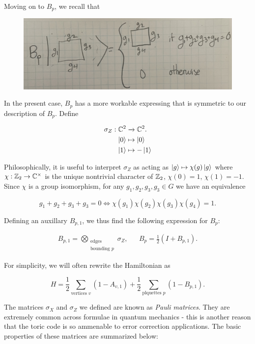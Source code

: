 \documentclass{article}
\theoremstyle{definition}
\numberwithin{figure}{section}
\begin{document}
Moving on to $B_p$, we recall that

\begin{figure}[h]
\begin{center}
\includegraphics[scale=.04]{Bp-definition}
\end{center}
\end{figure}

In the present case, $B_p$ has a more workable expressing that is symmetric to our description of $B_p$. Define

\begin{align*}
\sigma_Z:\mathbb{C}^2&\xrightarrow{}\mathbb{C}^2.\\
\ket{0}&\mapsto \ket{0}\\
\ket{1}&\mapsto -\ket{1}
\end{align*}

Philosophically, it is useful to interpret $\sigma_Z$ as acting as $\ket{g}\mapsto \chi(g)\ket{g}$ where $\chi:\mathbb{Z}_2\to\mathbb{C}^\times$ is the unique nontrivial character of $\mathbb{Z}_2$, $\chi(0)=1$, $\chi(1)=-1$. Since $\chi$ is a group isomorphism, for any $g_1,g_2,g_3,g_3\in G$ we have an equivalence

$$g_1+g_2+g_3+g_3=0 \iff \chi(g_1)\chi(g_2)\chi(g_3)\chi(g_4)=1.$$

Defining an auxillary $B_{p,1}$, we thus find the following expression for $B_p$:

\begin{align*}
B_{p,1}=\bigotimes_{\substack{\text{edges} \\ \text{bounding }p}}\sigma_Z, && B_p=\frac{1}{2}\left(I + B_{p,1}\right).
\end{align*}

For simplicity, we will often rewrite the Hamiltonian as

$$H=\frac{1}{2}\sum_{\text{vertices }v}(1-A_{v,1})+\frac{1}{2}\sum_{\text{plquettes }p}(1-B_{p,1}).$$

The matrices $\sigma_X$ and $\sigma_Z$ we defined are known as \textit{Pauli matrices}. They are extremely common across formulae in quantum mechanics - this is another reason that the toric code is so ammenable to error correction applications. The basic properties of these matrices are summarized below:
\end{document}

